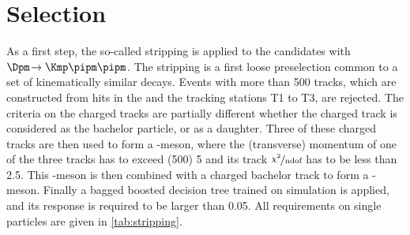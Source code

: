 \section{Selection}
\label{sec:selection}

As a first step, the so-called stripping is applied to the \BdToDpi candidates with \mbox{$\Dpm\!\to\Kmp\pipm\pipm$}.
The stripping is a first loose preselection common to a set of kinematically similar decays.
Events with more than \num{500} tracks, which are constructed from hits in the \velo and the tracking stations T1 to T3, are rejected.
The criteria on the charged tracks are partially different whether the charged track is considered as the bachelor particle, or as a \Dm daughter.
Three of these charged tracks are then used to form a \Dm-meson, where the (transverse) momentum of one of the three tracks has to exceed (\SI[per-mode=symbol]{500}{\MeVc}) \SI[per-mode=symbol]{5}{\GeVc} and its track $\nicefrac{\chi^2}{\text{ndof}}$ has to be less than \num{2.5}.
This \Dm-meson is then combined with a charged bachelor track to form a \Bz-meson.
Finally a bagged boosted decision tree trained on simulation is applied, and its response is required to be larger than \num{0.05}.
All requirements on single particles are given in \cref{tab:stripping}.
